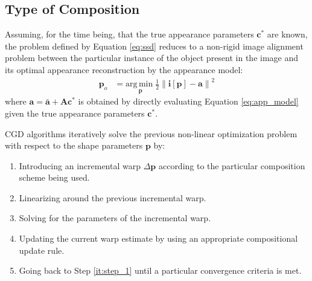 \subsection{Type of Composition}
\label{sec:composition}

Assuming, for the time being, that the true appearance parameters $\mathbf{c}^*$ are known, the problem defined by Equation \ref{eq:ssd} reduces to a non-rigid image alignment problem \cite{Baker2004, Munoz2014} between the particular instance of the object present in the image and its optimal appearance reconstruction by the appearance model:
\begin{equation}
    \begin{aligned}
        \mathbf{p}_o & = \underset{\mathbf{p}}{\mathrm{arg\,min\;}} 
        \frac{1}{2}\left\| \mathbf{i}[\mathbf{p}] - \mathbf{a} \right\|^2 
    \label{eq:ssd_shape}
    \end{aligned}
\end{equation}
where $\mathbf{a} = \bar{\mathbf{a}} + \mathbf{A} \mathbf{c}^*$ is obtained by directly evaluating Equation \ref{eq:app_model} given the true appearance parameters $\mathbf{c}^*$.

CGD algorithms iteratively solve the previous non-linear optimization problem with respect to the shape parameters $\mathbf{p}$ by:
\begin{enumerate}
    \item Introducing an incremental warp $\Delta\mathbf{p}$ according to the particular composition scheme being used.
    \label{it:step_1}
    
    \item Linearizing around the previous incremental warp.
    \label{it:step_2}
    
    \item Solving for the parameters of the incremental warp.
    \label{it:step_3}

    \item Updating the current warp estimate by using an appropriate compositional update rule.
    \label{it:step_4}

    \item Going back to Step \ref{it:step_1} until a particular convergence criteria is met.
    \label{it:step_5}
\end{enumerate}


